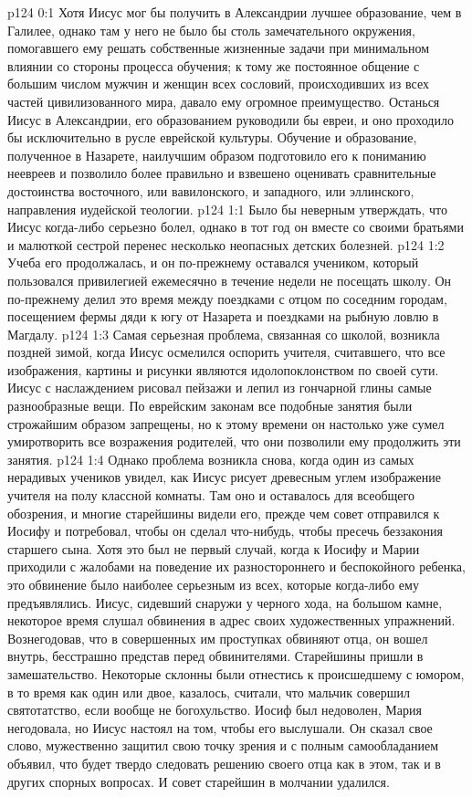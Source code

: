 \author{Комиссия срединников}
\vs p124 0:1 Хотя Иисус мог бы получить в Александрии лучшее образование, чем в Галилее, однако там у него не было бы столь замечательного окружения, помогавшего ему решать собственные жизненные задачи при минимальном влиянии со стороны процесса обучения; к тому же постоянное общение с большим числом мужчин и женщин всех сословий, происходивших из всех частей цивилизованного мира, давало ему огромное преимущество. Останься Иисус в Александрии, его образованием руководили бы евреи, и оно проходило бы исключительно в русле еврейской культуры. Обучение и образование, полученное в Назарете, наилучшим образом подготовило его к пониманию неевреев и позволило более правильно и взвешено оценивать сравнительные достоинства восточного, или вавилонского, и западного, или эллинского, направления иудейской теологии.
\vs p124 1:1 Было бы неверным утверждать, что Иисус когда\hyp{}либо серьезно болел, однако в тот год он вместе со своими братьями и малюткой сестрой перенес несколько неопасных детских болезней.
\vs p124 1:2 Учеба его продолжалась, и он по\hyp{}прежнему оставался учеником, который пользовался привилегией ежемесячно в течение недели не посещать школу. Он по\hyp{}прежнему делил это время между поездками с отцом по соседним городам, посещением фермы дяди к югу от Назарета и поездками на рыбную ловлю в Магдалу.
\vs p124 1:3 \pc Самая серьезная проблема, связанная со школой, возникла поздней зимой, когда Иисус осмелился оспорить учителя, считавшего, что все изображения, картины и рисунки являются идолопоклонством по своей сути. Иисус с наслаждением рисовал пейзажи и лепил из гончарной глины самые разнообразные вещи. По еврейским законам все подобные занятия были строжайшим образом запрещены, но к этому времени он настолько уже сумел умиротворить все возражения родителей, что они позволили ему продолжить эти занятия.
\vs p124 1:4 Однако проблема возникла снова, когда один из самых нерадивых учеников увидел, как Иисус рисует древесным углем изображение учителя на полу классной комнаты. Там оно и оставалось для всеобщего обозрения, и многие старейшины видели его, прежде чем совет отправился к Иосифу и потребовал, чтобы он сделал что\hyp{}нибудь, чтобы пресечь беззакония старшего сына. Хотя это был не первый случай, когда к Иосифу и Марии приходили с жалобами на поведение их разностороннего и беспокойного ребенка, это обвинение было наиболее серьезным из всех, которые когда\hyp{}либо ему предъявлялись. Иисус, сидевший снаружи у черного хода, на большом камне, некоторое время слушал обвинения в адрес своих художественных упражнений. Вознегодовав, что в совершенных им проступках обвиняют отца, он вошел внутрь, бесстрашно представ перед обвинителями. Старейшины пришли в замешательство. Некоторые склонны были отнестись к происшедшему с юмором, в то время как один или двое, казалось, считали, что мальчик совершил святотатство, если вообще не богохульство. Иосиф был недоволен, Мария негодовала, но Иисус настоял на том, чтобы его выслушали. Он сказал свое слово, мужественно защитил свою точку зрения и с полным самообладанием объявил, что будет твердо следовать решению своего отца как в этом, так и в других спорных вопросах. И совет старейшин в молчании удалился.

